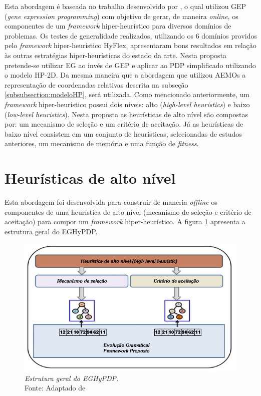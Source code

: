 Esta abordagem é baseada no trabalho desenvolvido por \cite{sabar2015automatic}, o qual  utilizou GEP (\textit{gene expression programming}) com objetivo de gerar, de maneira \textit{online}, os componentes de um \textit{framework} hiper-heurístico para diversos domínios de problemas. Os testes de generalidade realizados, utilizando os 6 domínios providos pelo \textit{framework} hiper-heurístico HyFlex, apresentaram bons resultados em relação às outras estratégias hiper-heurísticas do estado da arte. Nesta proposta pretende-se utilizar EG ao invés de GEP e aplicar ao PDP simplificado utilizando o modelo HP-2D. Da mesma maneira que a abordagem que utilizou  AEMOs a representação de coordenadas relativas descrita na subseção \ref{subsubsection:modeloHP}, será utilizada. Como mencionado anteriormente, um \textit{framework} hiper-heurístico possui dois níveis: alto (\textit{high-level heuristics}) e baixo (\textit{low-level heuristics}). Nesta proposta as heurísticas de alto nível são compostas por: um mecanismo de seleção e um critério de aceitação. Já as heurísticas de baixo nível consistem em um conjunto de heurísticas, selecionadas de estudos anteriores, um mecanismo de memória e uma função de \textit{fitness}. 

\section{Heurísticas de alto nível}
\label{sec:highlevelheuristics}
Esta abordagem  foi desenvolvida para construir de maneria \textit{offline} os componentes de uma heurística de alto nível (mecanismo de seleção e critério de aceitação) para compor um \textit{framework} hiper-heurístico. A figura \ref{fig:proposedFramework} apresenta a estrutura geral do EGHyPDP. 

\begin{figure}[!htb]
	\centering
	\includegraphics[scale=.98]{Imagens/proposedFramework.png}
	\caption{ \textit{Estrutura geral do EGHyPDP.} \\ Fonte: Adaptado de \cite{sabar2015automatic}}
	\label{fig:proposedFramework}
\end{figure}


